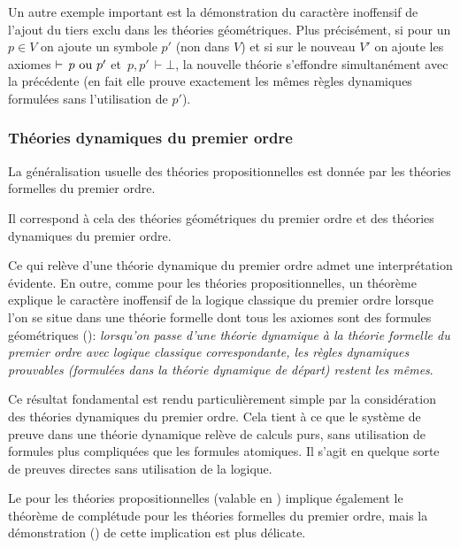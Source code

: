 Un autre exemple important est la démonstration du caractère inoffensif de l'ajout du tiers exclu dans les théories géométriques. Plus précisément, si pour un $p\in V$
on ajoute un symbole $p'$ (non dans $V$) et si sur le nouveau $V'$ on ajoute les axiomes $\vdash\,p \hbox{ ou }p'$ \hbox{et $p,p'\,\vdash \bot$}, la nouvelle théorie s'effondre simultanément avec la précédente (en fait elle prouve exactement les mêmes règles dynamiques formulées sans l'utilisation de $p'$).


\subsubsection*{Théories dynamiques du premier ordre \cite{clr}}

La généralisation usuelle des théories propositionnelles est donnée par les théories formelles du premier ordre.

Il correspond à cela des théories géométriques du premier ordre et
des théories dynamiques du premier ordre.

Ce qui relève d'une théorie dynamique du premier ordre admet une interprétation \cov évidente.
En outre, comme pour les théories propositionnelles, un théorème  explique le caractère inoffensif de
la logique classique du premier ordre lorsque l'on se situe dans une théorie formelle dont tous les axiomes sont des formules géométriques (\cite{clr}): \emph{lorsqu'on passe d'une théorie dynamique à la théorie formelle du premier ordre avec logique classique correspondante, les règles dynamiques prouvables (formulées dans la théorie dynamique de départ) restent les mêmes}. 

Ce résultat fondamental  est rendu
particulièrement simple par la considération des théories dynamiques du premier ordre. Cela tient à ce que le système de preuve dans une théorie dynamique
relève de calculs purs, sans utilisation de formules plus compliquées que les formules atomiques. Il s'agit en quelque sorte de preuves directes sans utilisation de la logique. 

Le \tcg pour les théories propositionnelles (valable en \clama) implique également le théorème de complétude pour les théories formelles du premier ordre, mais la démonstration (\cov) de cette implication est plus délicate.



